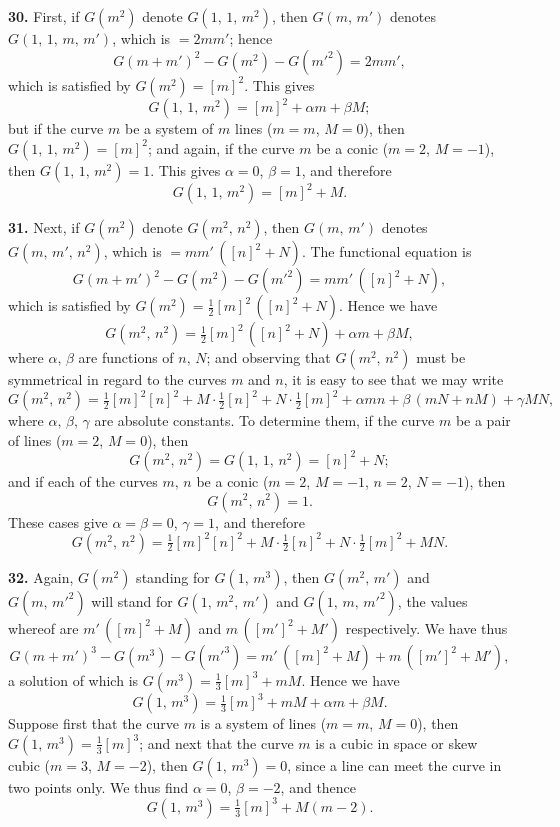 \documentclass[11pt,a4paper]{article}
\begin{document}
\medskip

\textbf{30.} First, if $G(m^2)$ denote $G(1,\,1,\,m^2)$, then $G(m,\,m')$ denotes $G(1,\,1,\,m,\,m')$, which is $= 2mm'$; hence
\[
G(m+m')^2 - G(m^2) - G(m'^2) = 2mm',
\]
which is satisfied by $G(m^2) = [m]^2$. This gives
\[
G(1,\,1,\,m^2) = [m]^2 + \alpha m + \beta M;
\]
but if the curve $m$ be a system of $m$ lines ($m=m$, $M=0$), then $G(1,\,1,\,m^2) = [m]^2$; and again, if the curve $m$ be a conic ($m=2$, $M=-1$), then $G(1,\,1,\,m^2) = 1$. This gives $\alpha = 0$, $\beta = 1$, and therefore
\[
G(1,\,1,\,m^2) = [m]^2 + M.
\]

\medskip

\textbf{31.} Next, if $G(m^2)$ denote $G(m^2,\,n^2)$, then $G(m,\,m')$ denotes $G(m,\,m',\,n^2)$, which is $= mm'\,([n]^2 + N)$. The functional equation is
\[
G(m+m')^2 - G(m^2) - G(m'^2) = mm'\,([n]^2 + N),
\]
which is satisfied by $G(m^2) = \tfrac{1}{2}[m]^2 \,([n]^2 + N)$. Hence we have
\[
G(m^2,\,n^2) = \tfrac{1}{2}[m]^2 \,([n]^2 + N) + \alpha m + \beta M,
\]
where $\alpha,\,\beta$ are functions of $n,\,N$; and observing that $G(m^2,\,n^2)$ must be symmetrical in regard to the curves $m$ and $n$, it is easy to see that we may write
\[
G(m^2,\,n^2) = \tfrac{1}{2}[m]^2 [n]^2 + M \cdot \tfrac{1}{2}[n]^2 + N \cdot \tfrac{1}{2}[m]^2 + \alpha mn + \beta\,(mN + nM) + \gamma MN,
\]
where $\alpha,\,\beta,\,\gamma$ are absolute constants. To determine them, if the curve $m$ be a pair of lines ($m=2$, $M=0$), then
\[
G(m^2,\,n^2) = G(1,\,1,\,n^2) = [n]^2 + N;
\]
and if each of the curves $m,\,n$ be a conic ($m=2$, $M=-1$, $n=2$, $N=-1$), then
\[
G(m^2,\,n^2) = 1.
\]
These cases give $\alpha = \beta = 0$, $\gamma = 1$, and therefore
\[
G(m^2,\,n^2) = \tfrac{1}{2}[m]^2 [n]^2 + M \cdot \tfrac{1}{2}[n]^2 + N \cdot \tfrac{1}{2}[m]^2 + MN.
\]

\medskip

\textbf{32.} Again, $G(m^2)$ standing for $G(1,\,m^3)$, then $G(m^2,\,m')$ and $G(m,\,m'^2)$ will stand for $G(1,\,m^2,\,m')$ and $G(1,\,m,\,m'^2)$, the values whereof are $m'\,([m]^2 + M)$ and $m\,([m']^2 + M')$ respectively. We have thus
\[
G(m+m')^3 - G(m^3) - G(m'^3) = m'\,([m]^2 + M) + m\,([m']^2 + M'),
\]
a solution of which is $G(m^3) = \tfrac{1}{3}[m]^3 + mM$. Hence we have
\[
G(1,\,m^3) = \tfrac{1}{3}[m]^3 + mM + \alpha m + \beta M.
\]
Suppose first that the curve $m$ is a system of lines ($m=m$, $M=0$), then $G(1,\,m^3) = \tfrac{1}{3}[m]^3$; and next that the curve $m$ is a cubic in space or skew cubic ($m=3$, $M=-2$), then $G(1,\,m^3) = 0$, since a line can meet the curve in two points only. We thus find $\alpha = 0$, $\beta = -2$, and thence
\[
G(1,\,m^3) = \tfrac{1}{3}[m]^3 + M(m-2).
\]
\end{document}
